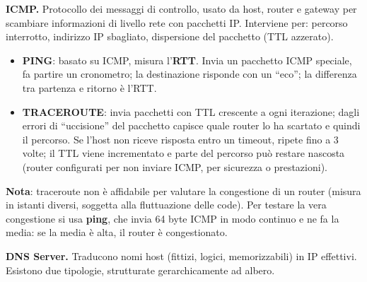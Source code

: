 \documentclass[11pt,a4paper]{report}
\begin{document}
\textbf{ICMP.} Protocollo dei messaggi di controllo, usato da host, router e gateway per scambiare informazioni di livello rete con pacchetti IP. Interviene per: percorso interrotto, indirizzo IP sbagliato, dispersione del pacchetto (TTL azzerato).
\begin{itemize}[noitemsep]
\item \textbf{PING}: basato su ICMP, misura l'\textbf{RTT}. Invia un pacchetto ICMP speciale, fa partire un cronometro; la destinazione risponde con un ``eco''; la differenza tra partenza e ritorno è l'RTT.
\item \textbf{TRACEROUTE}: invia pacchetti con TTL crescente a ogni iterazione; dagli errori di ``uccisione'' del pacchetto capisce quale router lo ha scartato e quindi il percorso. Se l'host non riceve risposta entro un timeout, ripete fino a 3 volte; il TTL viene incrementato e parte del percorso può restare nascosta (router configurati per non inviare ICMP, per sicurezza o prestazioni).
\end{itemize}
\textbf{Nota}: traceroute non è affidabile per valutare la congestione di un router (misura in istanti diversi, soggetta alla fluttuazione delle code). Per testare la vera congestione si usa \textbf{ping}, che invia 64 byte ICMP in modo continuo e ne fa la media: se la media è alta, il router è congestionato.

\textbf{DNS Server.} Traducono nomi host (fittizi, logici, memorizzabili) in IP effettivi. Esistono due tipologie, strutturate gerarchicamente ad albero.
\end{document}
